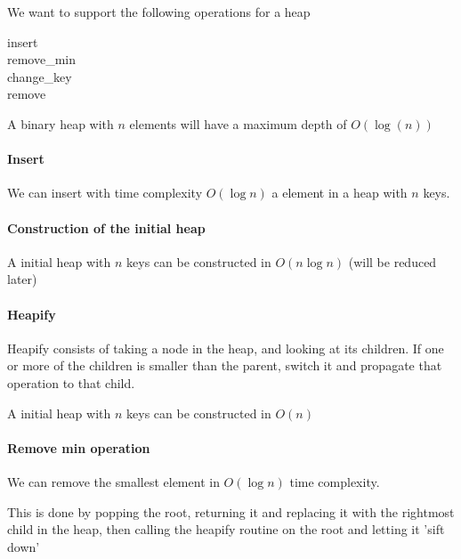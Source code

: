 \vspace{1cm}


We want to support the following operations for a heap
\begin{description}
\item[insert]  
\item[remove\_min] 
\item[change\_key] 
\item[remove] 
\end{description}

\begin{lem}
A binary heap with $n$ elements will have a maximum depth of $O(\log(n))$
\end{lem}


\paragraph{Insert}

\begin{lem}
We can insert with time complexity $O(\log n)$ a element in a heap with $n$ keys. 
\end{lem}

\paragraph{Construction of the initial heap}

\begin{lem}
A initial heap with $n$ keys can be constructed in $O(n\log n)$ (will be reduced later)
\end{lem}

\paragraph{Heapify}
Heapify consists of taking a node in the heap, and looking at its children. If one or more of the children is smaller than the parent, switch it and propagate that operation to that child.

\begin{lem}
A initial heap with $n$ keys can be constructed in $O(n)$
\end{lem}

\paragraph{Remove min operation}
\begin{lem}
We can remove the smallest element in $O(\log n )$ time complexity.
\end{lem}
This is done by popping the root, returning it and replacing it with the rightmost child in the heap, then calling the heapify routine on the root and letting it 'sift down'



